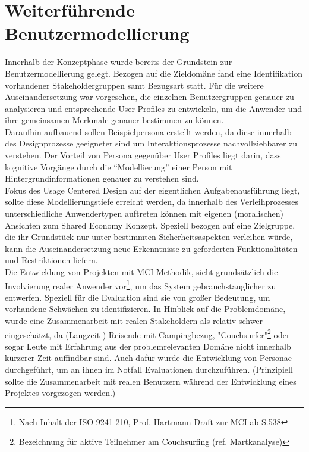 
\section{Weiterführende Benutzermodellierung}
Innerhalb der Konzeptphase wurde bereits der Grundstein zur Benutzermodellierung gelegt. Bezogen auf die Zieldomäne fand eine Identifikation vorhandener Stakeholdergruppen samt Bezugsart statt. Für die weitere Auseinandersetzung war vorgesehen, die einzelnen Benutzergruppen genauer zu analysieren und entsprechende User Profiles zu entwickeln, um die Anwender und ihre gemeinsamen Merkmale genauer bestimmen zu können.\\

Daraufhin aufbauend sollen Beispielpersona erstellt werden, da diese innerhalb des Designprozesse geeigneter sind um Interaktionsprozesse nachvollziehbarer zu verstehen. Der Vorteil von Persona gegenüber User Profiles liegt darin, dass kognitive Vorgänge durch die “Modellierung” einer Person mit Hintergrundinformationen genauer zu verstehen sind.\\
Fokus des Usage Centered Design auf der eigentlichen Aufgabenausführung liegt, sollte diese Modellierungstiefe erreicht werden, da innerhalb des Verleihprozesses unterschiedliche Anwendertypen auftreten können mit eigenen (moralischen) Ansichten zum Shared Economy Konzept. Speziell bezogen auf eine Zielgruppe, die ihr Grundstück nur unter bestimmten Sicherheitsaspekten verleihen würde, kann die Auseinandersetzung neue Erkenntnisse zu geforderten Funktionalitäten und Restriktionen liefern.\\

Die Entwicklung von Projekten mit MCI Methodik, sieht grundsätzlich die Involvierung realer Anwender vor\footnote{Nach Inhalt der ISO 9241-210, Prof. Hartmann Draft zur MCI ab S.538}, um das System gebrauchstauglicher zu entwerfen. Speziell für die Evaluation sind sie von großer Bedeutung, um vorhandene Schwächen zu identifizieren. In Hinblick auf die Problemdomäne, wurde eine Zusammenarbeit mit realen Stakeholdern als relativ schwer eingeschätzt, da (Langzeit-) Reisende mit Campingbezug, "Couchsurfer"\footnote{Bezeichnung für aktive Teilnehmer am Couchsurfing (ref. Martkanalyse)} oder sogar Leute mit Erfahrung 
aus der problemrelevanten Domäne nicht innerhalb kürzerer Zeit auffindbar sind. Auch dafür wurde die Entwicklung von Personae durchgeführt, um an ihnen im Notfall Evaluationen durchzuführen. (Prinzipiell sollte die Zusammenarbeit mit realen Benutzern während der Entwicklung eines Projektes vorgezogen werden.)\\

